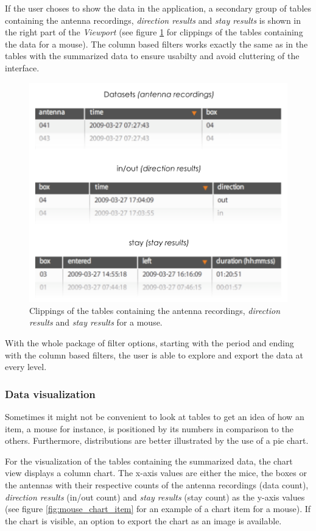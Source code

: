 If the user choses to show the data in the application, a secondary group of tables containing the antenna recordings, \textit{direction results} and \textit{stay results} is shown in the right part of the \textit{Viewport} (see figure \ref{fig:overview_data} for clippings of the tables containing the data for a mouse). The column based filters works exactly the same as in the tables with the summarized data to ensure usabilty and avoid cluttering of the interface. 

\begin{figure}[htpb]
\begin{center}
  \includegraphics[width=.66\textwidth]{assets/pdf/overview_data.pdf}
  \caption{Clippings of the tables containing the antenna recordings, \textit{direction results} and \textit{stay results} for a mouse.}
  \label{fig:overview_data}
\end{center}
\end{figure}  

With the whole package of filter options, starting with the period and ending with the column based filters, the user is able to explore and export the data at every level.       

\subsubsection{Data visualization}
\label{subsubsec:datavis}

Sometimes it might not be convenient to look at tables to get an idea of how an item, a mouse for instance, is positioned by its numbers in comparison to the others. Furthermore, distributions are better illustrated by the use of a pie chart. 

For the visualization of the tables containing the summarized data, the chart view displays a column chart. The x-axis values are either the mice, the boxes or the antennas with their respective counts of the antenna recordings (data count), \textit{direction results} (in/out count) and \textit{stay results} (stay count) as the y-axis values (see figure \ref{fig:mouse_chart_item} for an example of a chart item for a mouse). If the chart is visible, an option to export the chart as an image is available.

